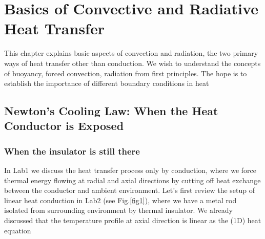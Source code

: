 \chapter{Basics of Convective and Radiative Heat Transfer}
This chapter explains basic aspects of convection and radiation, the two primary ways of heat transfer other than conduction. We wish to understand the concepts of buoyancy, forced convection, radiation from first principles. The hope is to establish the importance of different boundary conditions in heat 

\section{Newton's Cooling Law: When the Heat Conductor is Exposed}
\subsection{When the insulator is still there}
\quad In Lab1 we discuss the heat transfer process only by conduction, where we force thermal energy flowing at radial and axial directions by cutting off heat exchange between the conductor and ambient environment. Let's first review the setup of linear heat conduction in Lab2 (see Fig.\ref{fig1}), where we have a metal rod isolated from surrounding environment by thermal insulator. We already discussed that the temperature profile at axial direction is linear as the (1D) heat equation
